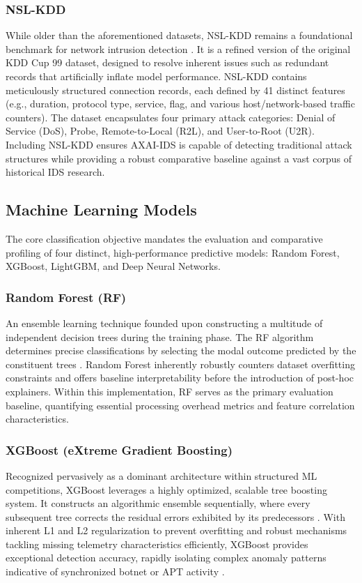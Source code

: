 \documentclass[conference]{IEEEtran}
\begin{document}
\subsubsection{NSL-KDD}
While older than the aforementioned datasets, NSL-KDD remains a foundational benchmark for network intrusion detection \cite{ribeiro2016should}. It is a refined version of the original KDD Cup 99 dataset, designed to resolve inherent issues such as redundant records that artificially inflate model performance. NSL-KDD contains meticulously structured connection records, each defined by 41 distinct features (e.g., duration, protocol type, service, flag, and various host/network-based traffic counters). The dataset encapsulates four primary attack categories: Denial of Service (DoS), Probe, Remote-to-Local (R2L), and User-to-Root (U2R). Including NSL-KDD ensures AXAI-IDS is capable of detecting traditional attack structures while providing a robust comparative baseline against a vast corpus of historical IDS research.

\subsection{Machine Learning Models}

The core classification objective mandates the evaluation and comparative profiling of four distinct, high-performance predictive models: Random Forest, XGBoost, LightGBM, and Deep Neural Networks. 

\subsubsection{Random Forest (RF)}
An ensemble learning technique founded upon constructing a multitude of independent decision trees during the training phase. The RF algorithm determines precise classifications by selecting the modal outcome predicted by the constituent trees \cite{chen2016xgboost}. Random Forest inherently robustly counters dataset overfitting constraints and offers baseline interpretability before the introduction of post-hoc explainers. Within this implementation, RF serves as the primary evaluation baseline, quantifying essential processing overhead metrics and feature correlation characteristics.

\subsubsection{XGBoost (eXtreme Gradient Boosting)}
Recognized pervasively as a dominant architecture within structured ML competitions, XGBoost leverages a highly optimized, scalable tree boosting system. It constructs an algorithmic ensemble sequentially, where every subsequent tree corrects the residual errors exhibited by its predecessors \cite{ke2017lightgbm}. With inherent L1 and L2 regularization to prevent overfitting and robust mechanisms tackling missing telemetry characteristics efficiently, XGBoost provides exceptional detection accuracy, rapidly isolating complex anomaly patterns indicative of synchronized botnet or APT activity \cite{ahmad2020network}.
\end{document}
